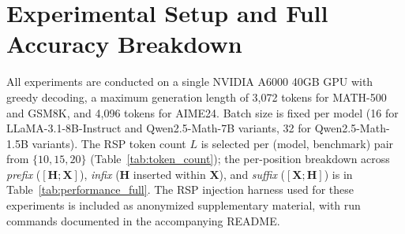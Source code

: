 

\clearpage
\section{Experimental Setup and Full Accuracy Breakdown}\label{app:setup}\label{app:ablation}

All experiments are conducted on a single NVIDIA A6000 40GB GPU with greedy decoding, a maximum generation length of 3{,}072 tokens for MATH-500 and GSM8K, and 4{,}096 tokens for AIME24. Batch size is fixed per model (16 for LLaMA-3.1-8B-Instruct and Qwen2.5-Math-7B variants, 32 for Qwen2.5-Math-1.5B variants). The RSP token count $L$ is selected per (model, benchmark) pair from $\{10, 15, 20\}$ (Table~\ref{tab:token_count}); the per-position breakdown across \emph{prefix} ($[\mathbf{H};\mathbf{X}]$), \emph{infix} ($\mathbf{H}$ inserted within $\mathbf{X}$), and \emph{suffix} ($[\mathbf{X};\mathbf{H}]$) is in Table~\ref{tab:performance_full}. The RSP injection harness used for these experiments is included as anonymized supplementary material, with run commands documented in the accompanying README.

